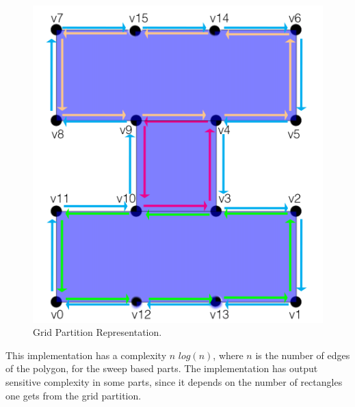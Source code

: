 \documentclass[12pt,a4paper,oneside]{article}
\begin{document}
\begin{figure}[h!]
  \centering \includegraphics[scale=0.2]{second.png}
  \caption{Grid Partition Representation.}
  \label{fig:grid}
\end{figure}

This implementation has a complexity $n$ $log(n)$, where $n$ is the number of edges of the polygon, for the sweep based parts. The implementation has output sensitive complexity in some parts, since it depends on the number of rectangles one gets from the grid partition.
\end{document}
